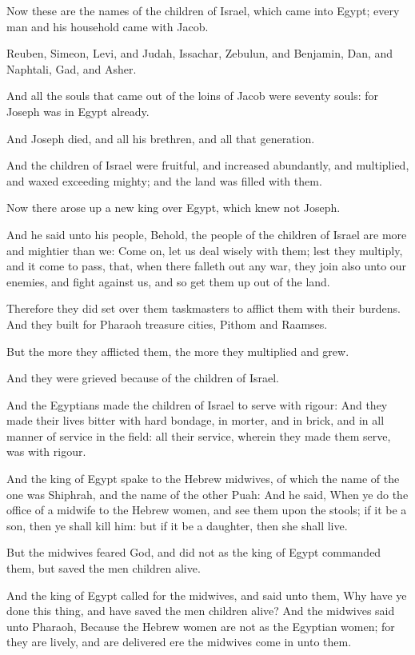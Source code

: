 \Chapter
\Verse Now these are the names of the children of Israel, which came into Egypt; every man and his household came with Jacob.

\Verse Reuben, Simeon, Levi, and Judah, \Verse Issachar, Zebulun, and Benjamin, \Verse Dan, and Naphtali, Gad, and Asher.

\Verse And all the souls that came out of the loins of Jacob were seventy souls: for Joseph was in Egypt already.

\Verse And Joseph died, and all his brethren, and all that generation.

\Verse And the children of Israel were fruitful, and increased abundantly, and multiplied, and waxed exceeding mighty; and the land was filled with them.

\Verse Now there arose up a new king over Egypt, which knew not Joseph.

\Verse And he said unto his people, Behold, the people of the children of Israel are more and mightier than we: \Verse Come on, let us deal wisely with them; lest they multiply, and it come to pass, that, when there falleth out any war, they join also unto our enemies, and fight against us, and so get them up out of the land.

\Verse Therefore they did set over them taskmasters to afflict them with their burdens. And they built for Pharaoh treasure cities, Pithom and Raamses.

\Verse But the more they afflicted them, the more they multiplied and grew.

And they were grieved because of the children of Israel.

\Verse And the Egyptians made the children of Israel to serve with rigour: \Verse And they made their lives bitter with hard bondage, in morter, and in brick, and in all manner of service in the field: all their service, wherein they made them serve, was with rigour.

\Verse And the king of Egypt spake to the Hebrew midwives, of which the name of the one was Shiphrah, and the name of the other Puah: \Verse And he said, When ye do the office of a midwife to the Hebrew women, and see them upon the stools; if it be a son, then ye shall kill him: but if it be a daughter, then she shall live.

\Verse But the midwives feared God, and did not as the king of Egypt commanded them, but saved the men children alive.

\Verse And the king of Egypt called for the midwives, and said unto them, Why have ye done this thing, and have saved the men children alive?  \Verse And the midwives said unto Pharaoh, Because the Hebrew women are not as the Egyptian women; for they are lively, and are delivered ere the midwives come in unto them.

